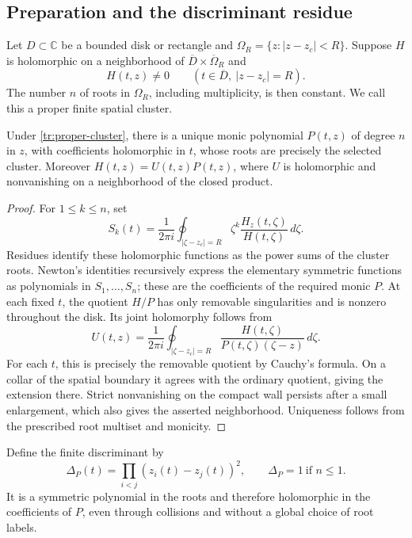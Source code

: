 \subsection{Preparation and the discriminant residue}

Let $D\subset\mathbb C$ be a bounded disk or rectangle and
$\Omega_R=\{z:|z-z_c|<R\}$.  Suppose $H$ is holomorphic on a
neighborhood of $\overline D\times\overline\Omega_R$ and
\begin{equation}\label{tr:proper-cluster}
 H(t,z)\ne0\qquad(t\in\overline D,\ |z-z_c|=R).
\end{equation}
The number $n$ of roots in $\Omega_R$, including multiplicity, is then
constant.  We call this a proper finite spatial cluster.

\begin{lemma}\label{tr:preparation}
Under \eqref{tr:proper-cluster}, there is a unique monic polynomial
$P(t,z)$ of degree $n$ in $z$, with coefficients holomorphic in $t$,
whose roots are precisely the selected cluster.  Moreover
$H(t,z)=U(t,z)P(t,z)$, where $U$ is holomorphic and nonvanishing on a
neighborhood of the closed product.
\end{lemma}

\begin{proof}
For $1\leq k\leq n$, set
\[
 S_k(t)=\frac1{2\pi i}\oint_{|\zeta-z_c|=R}
           \zeta^k\frac{H_z(t,\zeta)}{H(t,\zeta)}\,d\zeta.
\]
Residues identify these holomorphic functions as the power sums of the
cluster roots.  Newton's identities recursively express the elementary
symmetric functions as polynomials in $S_1,\ldots,S_n$; these are the
coefficients of the required monic $P$.  At each fixed $t$, the quotient
$H/P$ has only removable singularities and is nonzero throughout the
disk.  Its joint holomorphy follows from
\[
 U(t,z)=\frac1{2\pi i}\oint_{|\zeta-z_c|=R}
             \frac{H(t,\zeta)}{P(t,\zeta)(\zeta-z)}\,d\zeta.
\]
For each $t$, this is precisely the removable quotient by Cauchy's
formula.  On a collar of the spatial boundary it agrees with the
ordinary quotient, giving the extension there.  Strict nonvanishing on
the compact wall persists after a small enlargement, which also gives
the asserted neighborhood.  Uniqueness follows from the prescribed
root multiset and monicity.
\end{proof}

Define the finite discriminant by
\begin{equation}\label{tr:discriminant}
 \Delta_P(t)=\prod_{i<j}(z_i(t)-z_j(t))^2,
                   \qquad \Delta_P=1\ \text{if }n\leq1.
\end{equation}
It is a symmetric polynomial in the roots and therefore holomorphic in
the coefficients of $P$, even through collisions and without a global
choice of root labels.

